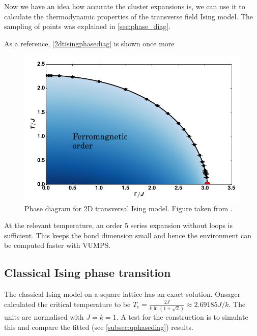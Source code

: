 
Now we have an idea how accurate the cluster expansions is, we can use it to calculate the thermodynamic properties of the transverse field Ising model. The sampling of points was explained in \cref{sec:phase_diag}.

As a reference, \cref{2dtisingphasediag} is shown once more

\begin{figure}[h!]
    \center
    \includegraphics[width=\textwidth]{Figuren/phsyics/2disingphase.png}
    \caption{Phase diagram for 2D transversal Ising model. Figure taken from \cite{Hesselmann2016}.}
    \label{2dtisingphasediag2}
\end{figure}

At the relevant temperature, an order 5 series expansion without loops is sufficient. This keeps the bond dimension small and hence the environment can be computed faster with \Gls{VUMPS}.

\subsection{Classical Ising phase transition}
The classical Ising model on a square lattice has an exact solution. Onsager calculated the critical temperature to be $T_c = \frac{2 J}{k \ln(1+\sqrt{2}) } \approx 2.69185 J/k$.  The units are normalised with $J=k=1$. A test for the construction is to simulate this and compare the fitted (see \cref{subsec:qphasediag}) results.

